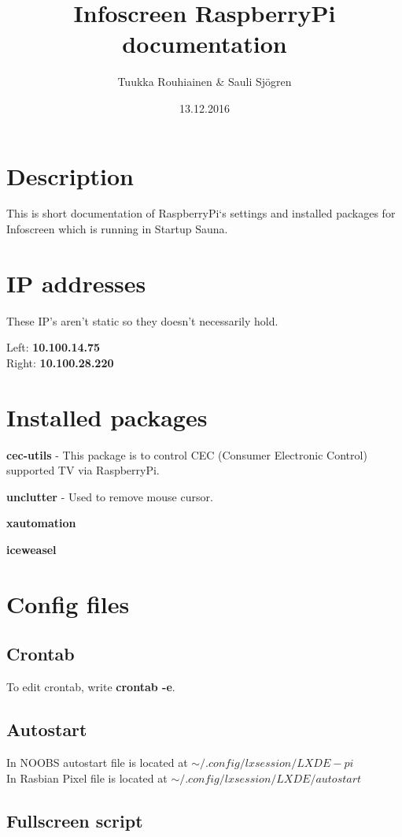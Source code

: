 \documentclass{article}
\title{Infoscreen RaspberryPi documentation}
\author{Tuukka Rouhiainen \& Sauli Sjögren}
\begin{document}
\date{13.12.2016}
\maketitle
\thispagestyle{fancy}

\section{Description}
This is short documentation of RaspberryPi`s settings and installed packages for Infoscreen which is running in Startup Sauna.
\section{IP addresses}
These IP's aren't static so they doesn't necessarily hold.

Left: \textbf{10.100.14.75} \\
Right: \textbf{10.100.28.220}
\section{Installed packages}
\textbf{cec-utils} - This package is to control CEC (Consumer Electronic Control) supported TV via RaspberryPi.

\textbf{unclutter} - Used to remove mouse cursor.

\textbf{xautomation}

\textbf{iceweasel}
\section{Config files}
\subsection{Crontab}
To edit crontab, write \textbf{crontab -e}.



\subsection{Autostart}
In NOOBS autostart file is located at $\sim/.config/lxsession/LXDE-pi$ \\
In Rasbian Pixel file is located at $\sim/.config/lxsession/LXDE/autostart$



\subsection{Fullscreen script}

\end{document}

